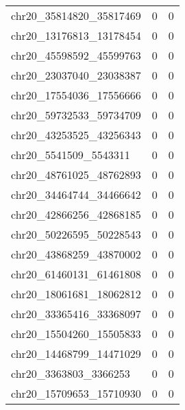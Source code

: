 \begin{longtable}{lrr}
chr20_35814820_35817469 & 0 & 0 \\
chr20_13176813_13178454 & 0 & 0 \\
chr20_45598592_45599763 & 0 & 0 \\
chr20_23037040_23038387 & 0 & 0 \\
chr20_17554036_17556666 & 0 & 0 \\
chr20_59732533_59734709 & 0 & 0 \\
chr20_43253525_43256343 & 0 & 0 \\
chr20_5541509_5543311 & 0 & 0 \\
chr20_48761025_48762893 & 0 & 0 \\
chr20_34464744_34466642 & 0 & 0 \\
chr20_42866256_42868185 & 0 & 0 \\
chr20_50226595_50228543 & 0 & 0 \\
chr20_43868259_43870002 & 0 & 0 \\
chr20_61460131_61461808 & 0 & 0 \\
chr20_18061681_18062812 & 0 & 0 \\
chr20_33365416_33368097 & 0 & 0 \\
chr20_15504260_15505833 & 0 & 0 \\
chr20_14468799_14471029 & 0 & 0 \\
chr20_3363803_3366253 & 0 & 0 \\
chr20_15709653_15710930 & 0 & 0 \\
\end{longtable}
